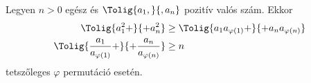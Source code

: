 Legyen $n>0$ egész és $\Tolig{a_{1},}{,a_{n}}$ pozitív valós szám. Ekkor 
\begin{align*}
\Tolig{a_{1}^{2}+}{+a_{n}^{2}} &\ge \Tolig{a_{1}a_{\varphi(1)}+}{+a_{n}a_{\varphi(n)}} \\
\Tolig{\frac{a_{1}}{a_{\varphi(1)}}+}{+\frac{a_{n}}{a_{\varphi(n)}}} &\ge n
\end{align*}
tetszőleges $\varphi$ permutáció esetén.
